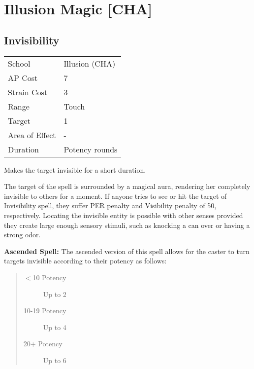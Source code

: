 \documentclass[11pt,a4paper,twocolumn]{book}
\begin{document}
\bigskip

\section*{Illusion Magic [CHA]}

\subsection*{Invisibility}
{
	\begin{tabu} to 75mm{| X[l,4] | X[l,7] |}
		\hline
		School 			& Illusion (CHA) 		\\
		AP Cost	      	& 7 					\\
		Strain Cost     & 3 					\\
		Range     		& Touch 				\\
		Target      	& 1						\\
		Area of Effect  & -  	 				\\
		Duration     	& Potency rounds		\\ \hline
	\end{tabu}
	
}

\medskip

Makes the target invisible for a short duration.

The target of the spell is surrounded by a magical aura, rendering her completely invisible to others for a moment. If anyone tries to see or hit the target of Invisibility spell, they suffer PER penalty and Visibility penalty of 50, respectively. Locating the invisible entity is possible with other senses provided they create large enough sensory stimuli, such as knocking a can over or having a strong odor.

\bigskip

\textbf{Ascended Spell:} The ascended version of this spell allows for the caster to turn targets invisible according to their potency as follows:
\begin{quote}
	\begin{description}
		\item[$<$10 Potency] 	Up to 2
		\item[10-19 Potency] 	Up to 4
		\item[20+ Potency] 	    Up to 6
	\end{description}
\end{quote}
\end{document}
